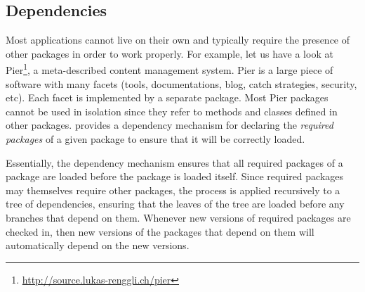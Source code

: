 \documentclass[a4paper,10pt,twoside]{book}
\begin{document}
%
%
%
%
\subsection{Dependencies}

Most applications cannot live on their own and typically require the presence of other packages in order to work properly. For example, let us have a look at Pier\footnote{\url{http://source.lukas-renggli.ch/pier}}, a meta-described content management system. Pier is a large piece of software with many facets (tools, documentations, blog, catch strategies, security, etc). Each facet is implemented by a separate package. Most Pier packages cannot be used in isolation since they refer to methods and classes defined in other packages. \Mont provides a dependency mechanism for declaring the \emph{required packages} of a given package to ensure that it will be correctly loaded.

Essentially, the dependency mechanism ensures that all required packages of a package are loaded before the package is loaded itself. Since required packages may themselves require other packages, the process is applied recursively to a tree of dependencies, ensuring that the leaves of the tree are loaded before any branches that depend on them.
Whenever new versions of required packages are checked in, then new versions of the packages that depend on them will automatically depend on the new versions.

\end{document}
